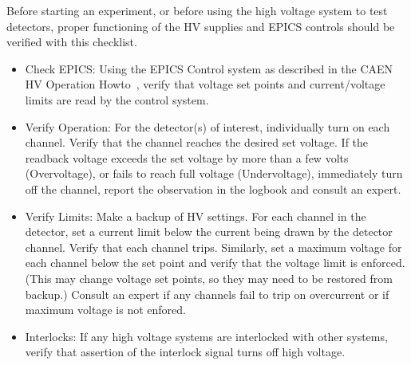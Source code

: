 Before starting an experiment, or before using the high voltage system to
test detectors, proper functioning of the HV supplies and EPICS controls
should be verified with this checklist.
\begin{itemize}
  \item{Check EPICS: Using the EPICS Control system as described in the CAEN HV
  Operation Howto~\cite{howto:CAEN_HV_operation}, verify that voltage set
  points and current/voltage limits are read by the control system.}
  \item{Verify Operation: For the detector(s) of interest, individually
  turn on each channel.  Verify that the channel reaches the desired
  set voltage.  If the readback voltage exceeds the set voltage by more
  than a few volts
  (Overvoltage), or fails to reach full voltage (Undervoltage), immediately
  turn off the channel, report the observation in the logbook and consult
  an expert.}
  \item{Verify Limits: Make a backup of HV settings.  For each channel in the
  detector, set a current limit below the current being drawn by the detector
  channel.  Verify that each channel trips.  Similarly, set a maximum voltage
  for each channel below the set point and verify that the voltage limit
  is enforced.  (This may change voltage set points, so they may need to
  be restored from backup.)  Consult an expert if any channels fail to trip
  on overcurrent or if maximum voltage is not enfored.}
  \item{Interlocks: If any high voltage systems are interlocked with other
  systems, verify that assertion of the interlock signal turns off high
  voltage.}
\end{itemize}
